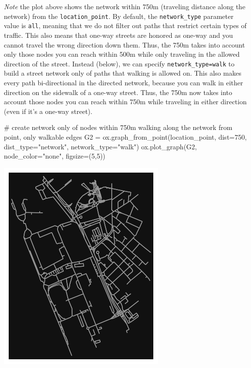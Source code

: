 \documentclass[
  letterpaper,
  DIV=11,
  numbers=noendperiod]{scrreprt}
\newenvironment{Shaded}{\begin{snugshade}}{\end{snugshade}}
\newcommand{\CommentTok}[1]{\textcolor[rgb]{0.37,0.37,0.37}{#1}}
\newcommand{\DecValTok}[1]{\textcolor[rgb]{0.68,0.00,0.00}{#1}}
\newcommand{\NormalTok}[1]{\textcolor[rgb]{0.00,0.23,0.31}{#1}}
\newcommand{\OperatorTok}[1]{\textcolor[rgb]{0.37,0.37,0.37}{#1}}
\newcommand{\StringTok}[1]{\textcolor[rgb]{0.13,0.47,0.30}{#1}}
\begin{document}
\emph{Note} the plot above shows the network within 750m (traveling
distance along the network) from the \texttt{location\_point}. By
default, the \texttt{network\_type} parameter value is \texttt{all},
meaning that we do not filter out paths that restrict certain types of
traffic. This also means that one-way streets are honored as one-way and
you cannot travel the wrong direction down them. Thus, the 750m takes
into account only those nodes you can reach within 500m while only
traveling in the allowed direction of the street. Instead (below), we
can specify
\texttt{network\_type=\textquotesingle{}walk\textquotesingle{}} to build
a street network only of paths that walking is allowed on. This also
makes every path bi-directional in the directed network, because you can
walk in either direction on the sidewalk of a one-way street. Thus, the
750m now takes into account those nodes you can reach within 750m while
traveling in either direction (even if it's a one-way street).

\begin{Shaded}
\begin{Highlighting}[]
\CommentTok{\# create network only of nodes within 750m walking along the network from point, only walkable edges}
\NormalTok{G2 }\OperatorTok{=}\NormalTok{ ox.graph\_from\_point(location\_point, dist}\OperatorTok{=}\DecValTok{750}\NormalTok{, dist\_type}\OperatorTok{=}\StringTok{"network"}\NormalTok{, network\_type}\OperatorTok{=}\StringTok{"walk"}\NormalTok{)}
\NormalTok{ox.plot\_graph(G2, node\_color}\OperatorTok{=}\StringTok{"none"}\NormalTok{, figsize}\OperatorTok{=}\NormalTok{(}\DecValTok{5}\NormalTok{,}\DecValTok{5}\NormalTok{))}
\end{Highlighting}
\end{Shaded}

\includegraphics{labs/w07_OSM_files/figure-pdf/cell-9-output-1.png}
\end{document}
